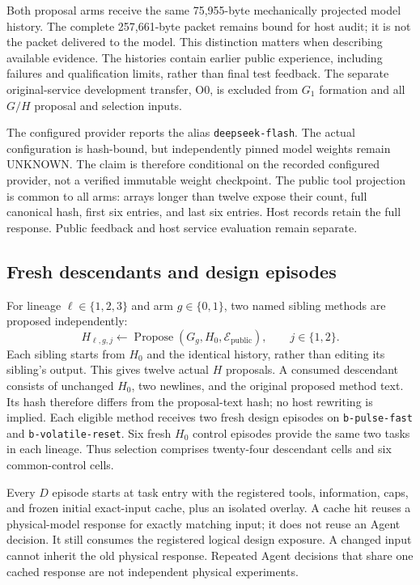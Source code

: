 Both proposal arms receive the same 75,955-byte mechanically projected model
history. The complete 257,661-byte packet remains bound for host audit; it is
not the packet delivered to the model. This distinction matters when
describing available evidence. The histories contain earlier public
experience, including failures and qualification limits, rather than final
test feedback. The separate original-service development transfer, O0, is
excluded from $G_1$ formation and all $G/H$ proposal and selection inputs.

The configured provider reports the alias \texttt{deepseek-flash}. The actual
configuration is hash-bound, but independently pinned model weights remain
UNKNOWN. The claim is therefore conditional on the recorded configured
provider, not a verified immutable weight checkpoint. The public tool
projection is common to all arms: arrays longer than twelve expose their
count, full canonical hash, first six entries, and last six entries. Host
records retain the full response. Public feedback and host service evaluation
remain separate.

\subsection{Fresh descendants and design episodes}

For lineage $\ell\in\{1,2,3\}$ and arm $g\in\{0,1\}$, two named sibling
methods are proposed independently:
\[
 H_{\ell,g,j}\leftarrow
 \operatorname{Propose}(G_g,H_0,\mathcal{E}_{\mathrm{public}}),
 \qquad j\in\{1,2\}.
\]
Each sibling starts from $H_0$ and the identical history, rather than editing
its sibling's output. This gives twelve actual $H$ proposals. A consumed
descendant consists of unchanged $H_0$, two newlines, and the original
proposed method text. Its hash therefore differs from the proposal-text hash;
no host rewriting is implied. Each eligible method receives two fresh design episodes on
\texttt{b-pulse-fast} and \texttt{b-volatile-reset}. Six fresh $H_0$ control
episodes provide the same two tasks in each lineage. Thus selection comprises
twenty-four descendant cells and six common-control cells.

Every $D$ episode starts at task entry with the registered tools, information,
caps, and frozen initial exact-input cache, plus an isolated overlay. A cache
hit reuses a physical-model response for exactly matching input; it does not
reuse an Agent decision. It still consumes the registered logical design
exposure. A changed input cannot inherit the old physical response. Repeated
Agent decisions that share one cached response are not independent physical
experiments.

